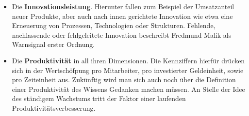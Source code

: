 \begin{itemize}
 \itemsep-8pt
 \item Die \textbf{Innovationsleistung}. Hierunter fallen zum Beispiel der Umsatzanteil neuer Produkte, aber auch nach innen gerichtete Innovation wie etwa eine Erneuerung von Prozessen, Technologien oder Strukturen. Fehlende, nachlassende oder fehlgeleitete Innovation beschreibt Fredmund Malik als Warnsignal erster Ordnung.
 \item Die \textbf{Produktivität} in all ihren Dimensionen. Die Kennziffern hierfür drücken sich in der Wertschöfpung pro Mitarbeiter, pro investierter Geldeinheit, sowie pro Zeiteinheit aus. Zukünftig wird man sich auch noch über die Definition einer Produktivität des Wissens Gedanken machen müssen. An Stelle der Idee des ständigem Wachstums tritt der Faktor einer laufenden Produktivitätsverbesserung.
\end{itemize} 

